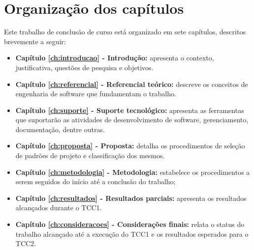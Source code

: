 \section{Organização dos capítulos}
    
Este trabalho de conclusão de curso está organizado em sete capítulos, descritos brevemente a seguir:

\begin{itemize}
    \item \textbf{Capítulo \ref{ch:introducao} - Introdução:} apresenta o contexto, justificativa, questões de pesquisa e objetivos.
    \item \textbf{Capítulo \ref{ch:referencial} - Referencial teórico:} descreve os conceitos de engenharia de software que fundamentam o trabalho.
    \item \textbf{Capítulo \ref{ch:suporte} - Suporte tecnológico:} apresenta as ferramentas que suportarão as atividades de desenvolvimento de software, gerenciamento, documentação, dentre outras.
    \item \textbf{Capítulo \ref{ch:proposta} - Proposta:} detalha os procedimentos de seleção de padrões de projeto e classificação dos mesmos.
    \item \textbf{Capítulo \ref{ch:metodologia} - Metodologia:} estabelece os procedimentos a serem seguidos do início até a conclusão do trabalho;
    \item \textbf{Capítulo \ref{ch:resultados} - Resultados parciais:} apresenta os resultados alcançados durante o TCC1.
    \item \textbf{Capítulo \ref{ch:consideracoes} - Considerações finais:} relata o status do trabalho alcançado até a execução do TCC1 e os resultados esperados para o TCC2.
\end{itemize}





